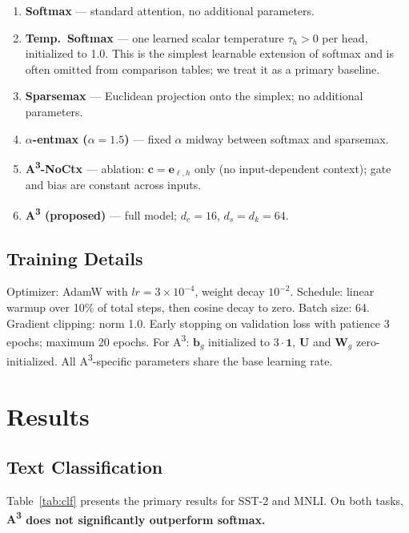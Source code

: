 \documentclass[11pt]{article}
\newcommand{\AAA}{\textsc{A\textsuperscript{3}}}
\newcommand{\bW}{\mathbf{W}}
\newcommand{\bU}{\mathbf{U}}
\newcommand{\bc}{\mathbf{c}}
\newcommand{\be}{\mathbf{e}}
\newcommand{\bb}{\mathbf{b}}
\begin{document}
\begin{enumerate}[leftmargin=1.5em,itemsep=2pt]
  \item \textbf{Softmax} --- standard attention, no additional parameters.
  \item \textbf{Temp.\ Softmax} --- one learned scalar temperature $\tau_h > 0$ per head, initialized to 1.0. This is the simplest learnable extension of softmax and is often omitted from comparison tables; we treat it as a primary baseline.
  \item \textbf{Sparsemax} \citep{martins2016softmax} --- Euclidean projection onto the simplex; no additional parameters.
  \item \textbf{$\alpha$-entmax ($\alpha{=}1.5$)} \citep{correia2019adaptively} --- fixed $\alpha$ midway between softmax and sparsemax.
  \item \textbf{\AAA{}-NoCtx} --- ablation: $\bc = \be_{\ell,h}$ only (no input-dependent context); gate and bias are constant across inputs.
  \item \textbf{\AAA{} (proposed)} --- full model; $d_e{=}16$, $d_s{=}d_k{=}64$.
\end{enumerate}

\subsection{Training Details}

Optimizer: AdamW \citep{loshchilov2019adamw} with $lr = 3 \times 10^{-4}$, weight decay $10^{-2}$. Schedule: linear warmup over 10\% of total steps, then cosine decay to zero. Batch size: 64. Gradient clipping: norm 1.0. Early stopping on validation loss with patience 3 epochs; maximum 20 epochs. For \AAA{}: $\bb_g$ initialized to $3 \cdot \mathbf{1}$, $\bU$ and $\bW_g$ zero-initialized. All \AAA{}-specific parameters share the base learning rate.

\section{Results}
\label{sec:results}

\subsection{Text Classification}

Table~\ref{tab:clf} presents the primary results for SST-2 and MNLI. On both tasks, \textbf{\AAA{} does not significantly outperform softmax.}
\end{document}
